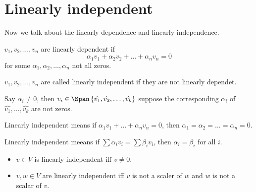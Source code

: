 \section{Linearly independent}
\begin{definition*}
    Now we talk about the linearly dependence and linearly independence.
    \begin{definition} \label{def: linearly dependent}
    \(v_1, v_2, \dots , v_n\) are linearly dependent if 
    \[
        \alpha _1 v_1 + \alpha _2 v_2 + \dots + \alpha _n v_n = 0
    \] for some \(\alpha _1, \alpha _2, \dots , \alpha _n\) not all zeros. 
\end{definition}

\begin{definition} \label{def: linearly independent}
    \(v_1, v_2, \dots , v_n\) are called linearly independent if they are not linearly dependet. 
\end{definition}
\end{definition*}

\begin{corollary}
    Say \(\alpha _i \neq 0\), then \(v_i \in \Span \left\{ \hat{v_1}, \hat{v_2}, \dots , \hat{v_k}   \right\} \) suppose the corresponding \(\alpha _i\) of \(\hat{v_1}, \dots , \hat{v_k}  \) are not zeros. 
\end{corollary}

\begin{corollary}
    Linearly independent means if \(\alpha _1 v_1 + \dots + \alpha _n v_n = 0\), then \(\alpha _1 = \alpha _2 = \dots = \alpha _n = 0\). 
\end{corollary}

\begin{corollary}
    Linearly independent meeans if \(\sum \alpha _i v_i = \sum \beta _i v_i  \), then \(\alpha _i = \beta _i\) for all \(i\).   
\end{corollary}

\begin{eg}
    \vphantom{text}
    \begin{itemize}
        \item \(v \in V\) is linearly independent iff \(v \neq 0\). 
        \item \(v, w \in V\) are linearly independent iff \(v\) is not a scaler of \(w\) and \(w\) is not a scalar of \(v\).       
    \end{itemize}
\end{eg}


